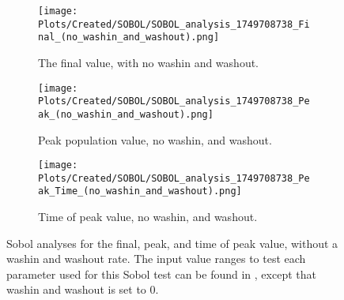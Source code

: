 \begin{figure}[ht!]
    \centering
    \begin{subfigure}{0.32\linewidth}
        \centering
        \captionsetup{width=1\linewidth}
        \texttt{[image: Plots/Created/SOBOL/SOBOL\_analysis\_1749708738\_Final\_(no\_washin\_and\_washout).png]}
        \caption{
            The final value, with no washin and washout. 
        }
        \label{fig:created:Sobol_final_no_wi_wo}
    \end{subfigure}
    \hfill
    \begin{subfigure}{0.32\linewidth}
        \centering
        \captionsetup{width=1\linewidth}
        \texttt{[image: Plots/Created/SOBOL/SOBOL\_analysis\_1749708738\_Peak\_(no\_washin\_and\_washout).png]}
        \caption{
            Peak population value, no washin, and washout. 
        }
        \label{fig:created:Sobol_peak_no_wi_wo}
    \end{subfigure}
    \hfill
    \begin{subfigure}{0.32\linewidth}
        \centering
        \captionsetup{width=1\linewidth}
        \texttt{[image: Plots/Created/SOBOL/SOBOL\_analysis\_1749708738\_Peak\_Time\_(no\_washin\_and\_washout).png]}
        \caption{
            Time of peak value, no washin, and washout. 
        }
        \label{fig:created:Sobol_peak_time_no_wi_wo}
    \end{subfigure}
    \caption{
        Sobol analyses for the final, peak, and time of peak value, without a washin and washout rate.
        The input value ranges to test each parameter used for this Sobol test can be found in , except that washin and washout is set to 0. 
    }
    \label{fig:created:Sobol_no_wi_wo}
\end{figure}

